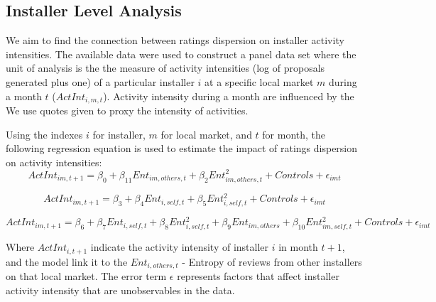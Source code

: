 \documentclass[msom,blindrev]{informs3}
\begin{document}
\subsection{Installer Level Analysis}
We aim to find the connection between ratings dispersion on installer activity intensities. The available data were used to construct a panel data set where the unit of analysis is the the measure of activity intensities (log of proposals generated plus one) of a particular installer $i$ at a specific local market $m$ during a month $t$ ($ActInt_{i,m,t}$). Activity intensity during a month are influenced by the  
We use quotes given to proxy the intensity of activities. 

Using the indexes $i$ for installer, $m$ for local market, and $t$ for month, the following regression equation is used to estimate the impact of ratings dispersion on activity intensities: 
\begin{equation}
    ActInt_{im,t+1}=\beta_{0}+\beta_{11} Ent_{im,others,t}+\beta_{2}Ent_{im,others,t}^2+  
   Controls+\epsilon_{imt} 
   \label{model_ind}
\end{equation}

\begin{equation}
    ActInt_{im,t+1}=\beta_{3}+\beta_{4} Ent_{i,self,t}+\beta_{5}Ent_{i,self,t}^2+  
   Controls+\epsilon_{imt} 
   \label{model_ind}
\end{equation}

\begin{equation}
    ActInt_{im,t+1}=\beta_{6}+\beta_{7} Ent_{i,self,t}+\beta_{8}Ent_{i,self,t}^2+\beta_{9}Ent_{im,others}+\beta_{10}Ent_{im,self,t}^2+  
   Controls+\epsilon_{imt} 
   \label{model_ind}
\end{equation}

Where $ActInt_{i,t+1}$ indicate the activity intensity of installer $i$ in month $t+1$, and the model link it to the $Ent_{i,others,t}$ - Entropy of reviews from other installers on that local market. The error term $\epsilon$ represents factors that affect installer activity intensity that are unobservables in the data.  
\end{document}
